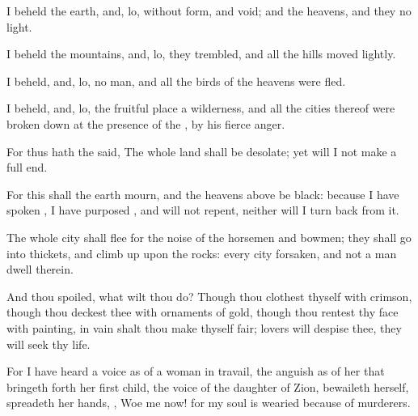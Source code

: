 {I
beheld the
earth, and, lo,
{} without
form, and
void; and the
heavens, and they
{} no
light.

I
beheld the
mountains, and, lo, they
trembled, and all the
hills moved
lightly.

I
beheld, and, lo,
{} no
man, and all the
birds of the
heavens were
fled.

I
beheld, and, lo, the fruitful
place
{} a
wilderness, and all the
cities thereof were broken
down at the
presence of the
{},
{} by his
fierce
anger.

For thus hath the
{}
said, The whole
land shall be
desolate; yet will I not
make a full
end.

For this shall the
earth
mourn, and the
heavens
above be
black: because I have
spoken
{}, I have
purposed
{}, and will not
repent, neither will I turn
back from it.

The whole
city shall
flee for the
noise of the
horsemen and
bowmen; they shall
go into
thickets, and climb
up upon the
rocks: every
city
{}
forsaken, and not a
man
dwell
therein.

And
{} thou
{}
spoiled, what wilt thou
do? Though thou
clothest thyself with
crimson, though thou
deckest thee with
ornaments of
gold, though thou
rentest thy
face with
painting, in
vain shalt thou make thyself
fair;
{}
lovers will
despise thee, they will
seek thy
life.

For I have
heard a
voice as of a woman in
travail,
{} the
anguish as of her that bringeth forth her first
child, the
voice of the
daughter of
Zion,
{}
bewaileth herself,
{}
spreadeth her
hands,
{},
Woe
{} me now! for my
soul is
wearied because of
murderers.




\par }
